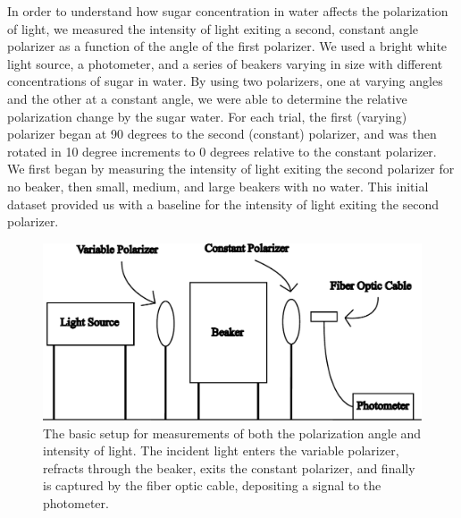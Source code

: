 
In order to understand how sugar concentration in water affects the polarization of light, we measured the intensity of light exiting a second, constant angle polarizer as a function of the angle of the first polarizer. We used a bright white light source, a photometer, and a series of beakers varying in size with different concentrations of sugar in water. By using two polarizers, one at varying angles and the other at a constant angle, we were able to determine the relative polarization change by the sugar water. For each trial, the first (varying) polarizer began at 90 degrees to the second (constant) polarizer, and was then rotated in 10 degree increments to 0 degrees relative to the constant polarizer. We first began by measuring the intensity of light exiting the second polarizer for no beaker, then small, medium, and large beakers with no water. This initial dataset provided us with a baseline for the intensity of light exiting the second polarizer.

\begin{figure}[H]
\centering
\includegraphics[scale=0.4]{../figures/setup.pdf}
\caption{The basic setup for measurements of both the polarization angle and intensity of light. The incident light enters the variable polarizer, refracts through the beaker, exits the constant polarizer, and finally is captured by the fiber optic cable, depositing a signal to the photometer.}
\end{figure}

